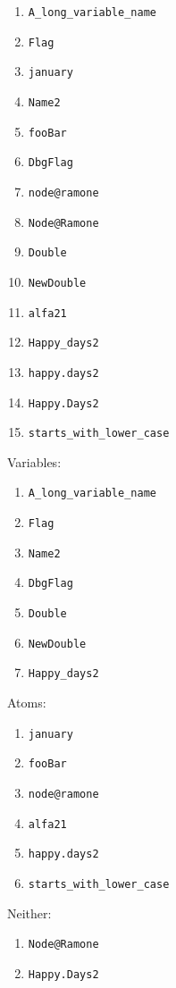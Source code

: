 \begin{questions}
    \begin{enumerate}
    \item {\tt A\_long\_variable\_name}
    \item {\tt Flag}
    \item {\tt january}
    \item {\tt Name2}
    \item {\tt fooBar}
    \item {\tt DbgFlag}
    \item {\tt node@ramone}
    \item {\tt Node@Ramone}
    \item {\tt Double}
    \item {\tt NewDouble}
    \item {\tt alfa21}
    \item {\tt Happy\_days2}
    \item {\tt happy.days2}
    \item {\tt Happy.Days2}
    \item {\tt starts\_with\_lower\_case}
    \end{enumerate}

    \begin{solution}
    Variables:
    \begin{enumerate}
    \item {\tt A\_long\_variable\_name}
    \item {\tt Flag}
    \item {\tt Name2}
    \item {\tt DbgFlag}
    \item {\tt Double}
    \item {\tt NewDouble}
    \item {\tt Happy\_days2}
    \end{enumerate}

    Atoms:
    \begin{enumerate}
    \item {\tt january}
    \item {\tt fooBar}
    \item {\tt node@ramone}
    \item {\tt alfa21}
    \item {\tt happy.days2}
    \item {\tt starts\_with\_lower\_case}
    \end{enumerate}

    Neither:
    \begin{enumerate}
    \item {\tt Node@Ramone}
    \item {\tt Happy.Days2}    
    \end{enumerate}
    \end{solution}


\end{questions}
